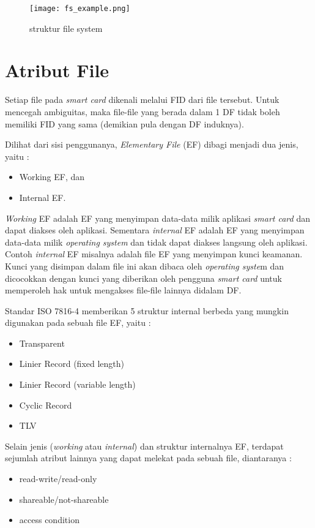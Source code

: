 \documentclass[a4paper, 12pt]{report}
\begin{document}
\begin{figure}
\centering
\texttt{[image: fs\_example.png]}
\caption{struktur file system}
\label{fig-fs-example}
\end{figure}

\section{Atribut File}
\label{file-attribute}

Setiap file pada \textsl{smart card} dikenali melalui FID dari file tersebut. Untuk mencegah ambiguitas, maka file-file yang berada dalam 1 DF tidak boleh memiliki FID yang sama (demikian pula dengan DF induknya). 

Dilihat dari sisi penggunanya, \emph{Elementary File} (EF) dibagi menjadi dua jenis, yaitu :
\begin{itemize}
\item Working EF, dan 
\item Internal EF.
\end{itemize}

 \emph{Working} EF adalah EF yang menyimpan data-data milik aplikasi \textsl{smart card} dan dapat diakses oleh aplikasi. Sementara \emph{internal} EF adalah EF yang menyimpan data-data milik \emph{operating system} dan tidak dapat diakses langsung oleh aplikasi. Contoh \emph{internal} EF misalnya adalah file EF yang menyimpan kunci keamanan. Kunci yang disimpan dalam file ini akan dibaca oleh \emph{operating syste}m dan dicocokkan dengan kunci yang diberikan oleh pengguna \textsl{smart card} untuk memperoleh hak untuk mengakses file-file lainnya didalam DF.

Standar ISO 7816-4 memberikan 5 struktur internal berbeda yang mungkin digunakan pada sebuah file EF, yaitu :
\begin {itemize}
\item Transparent
\item Linier Record (fixed length)
\item Linier Record (variable length)
\item Cyclic Record
\item TLV
\end {itemize}

Selain jenis (\emph{working} atau \emph{internal}) dan struktur internalnya EF, terdapat sejumlah atribut lainnya yang dapat melekat pada sebuah file, diantaranya :
\begin {itemize}
\item read-write/read-only
\item shareable/not-shareable
\item access condition
\end {itemize}
\end{document}
